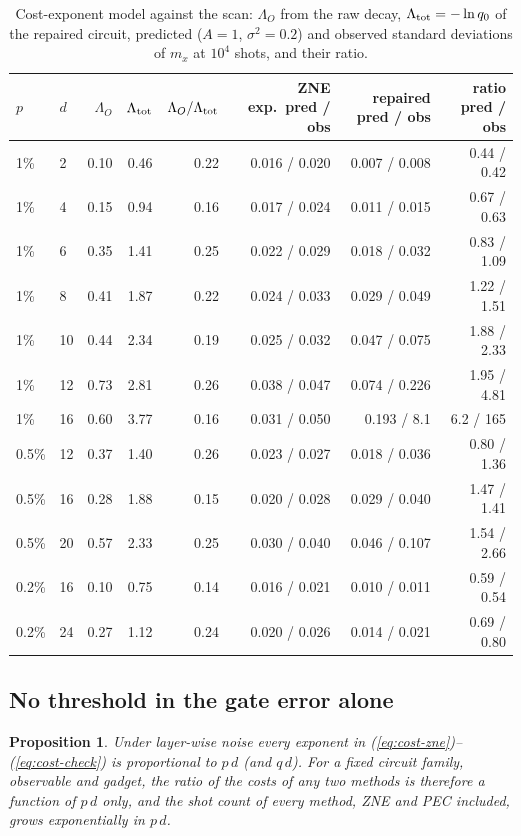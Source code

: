 \documentclass[11pt,a4paper]{article}
\newtheorem{proposition}{Proposition}
\theoremstyle{remark}
\begin{document}
\begin{table}[h]
\centering\footnotesize
\caption{Cost-exponent model against the scan: $\Lambda_O$ from the raw decay, $\Lambda_{\rm tot}=-\ln q_0$ of the repaired circuit, predicted ($A=1$, $\sigma^2=0.2$) and observed standard deviations of $m_x$ at $10^4$ shots, and their ratio.}
\label{tab:breakeven-check}
\setlength{\tabcolsep}{4pt}
\begin{tabular}{llrrrrrr}
\toprule
$p$ & $d$ & $\Lambda_O$ & $\Lambda_{\rm tot}$ & $\Lambda_O/\Lambda_{\rm tot}$ & ZNE exp.\ pred / obs & repaired pred / obs & ratio pred / obs \\
\midrule
1\% & 2 & 0.10 & 0.46 & 0.22 & 0.016 / 0.020 & 0.007 / 0.008 & 0.44 / 0.42 \\
1\% & 4 & 0.15 & 0.94 & 0.16 & 0.017 / 0.024 & 0.011 / 0.015 & 0.67 / 0.63 \\
1\% & 6 & 0.35 & 1.41 & 0.25 & 0.022 / 0.029 & 0.018 / 0.032 & 0.83 / 1.09 \\
1\% & 8 & 0.41 & 1.87 & 0.22 & 0.024 / 0.033 & 0.029 / 0.049 & 1.22 / 1.51 \\
1\% & 10 & 0.44 & 2.34 & 0.19 & 0.025 / 0.032 & 0.047 / 0.075 & 1.88 / 2.33 \\
1\% & 12 & 0.73 & 2.81 & 0.26 & 0.038 / 0.047 & 0.074 / 0.226 & 1.95 / 4.81 \\
1\% & 16 & 0.60 & 3.77 & 0.16 & 0.031 / 0.050 & 0.193 / 8.1 & 6.2 / 165 \\
0.5\% & 12 & 0.37 & 1.40 & 0.26 & 0.023 / 0.027 & 0.018 / 0.036 & 0.80 / 1.36 \\
0.5\% & 16 & 0.28 & 1.88 & 0.15 & 0.020 / 0.028 & 0.029 / 0.040 & 1.47 / 1.41 \\
0.5\% & 20 & 0.57 & 2.33 & 0.25 & 0.030 / 0.040 & 0.046 / 0.107 & 1.54 / 2.66 \\
0.2\% & 16 & 0.10 & 0.75 & 0.14 & 0.016 / 0.021 & 0.010 / 0.011 & 0.59 / 0.54 \\
0.2\% & 24 & 0.27 & 1.12 & 0.24 & 0.020 / 0.026 & 0.014 / 0.021 & 0.69 / 0.80 \\
\bottomrule
\end{tabular}
\end{table}

\subsection{No threshold in the gate error alone}

\begin{proposition}
Under layer-wise noise every exponent in (\ref{eq:cost-zne})--(\ref{eq:cost-check}) is proportional to $p\,d$ (and $q\,d$). For a fixed circuit family, observable and gadget, the ratio of the costs of any two methods is therefore a function of $p\,d$ only, and the shot count of every method, ZNE and PEC included, grows exponentially in $p\,d$.
\end{proposition}
\end{document}
